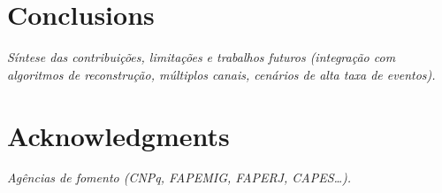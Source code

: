 \documentclass[journal]{IEEEtran}
\newcommand{\todo}[1]{\textcolor{red!70!black}{\textit{#1}}}
\begin{document}
\section{Conclusions}

\todo{Síntese das contribuições, limitações e trabalhos futuros (integração com algoritmos de reconstrução, múltiplos canais, cenários de alta taxa de eventos).}

\section*{Acknowledgments}

\todo{Agências de fomento (CNPq, FAPEMIG, FAPERJ, CAPES\ldots).}



\end{document}
